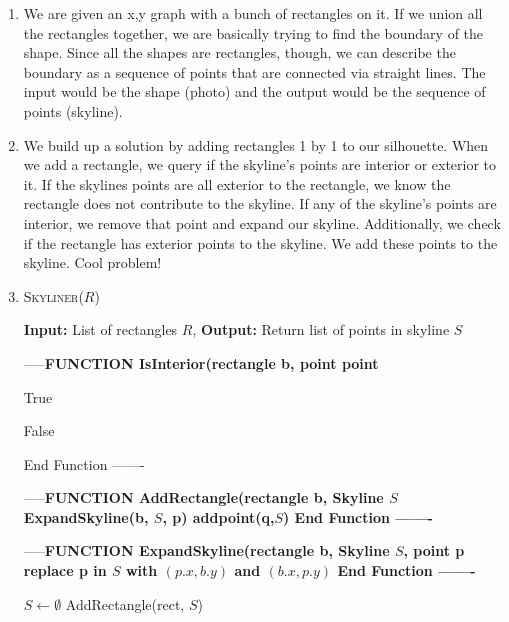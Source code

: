 \documentclass{article}
\begin{document}
\begin{enumerate}
	\item We are given an x,y graph with a bunch of rectangles on it. If we union all the rectangles together, we are basically trying to find the boundary of the shape. Since all the shapes are rectangles, though, we can describe the boundary as a sequence of points that are connected via straight lines. The input would be the shape (photo) and the output would be the sequence of points (skyline). 
	\item We build up a solution by adding rectangles 1 by 1 to our silhouette. When we add a rectangle, we query if the skyline's points are interior or exterior to it. If the skylines points are all exterior to the rectangle, we know the rectangle does not contribute to the skyline. If any of the skyline's points are interior, we remove that point and expand our skyline. Additionally, we check if the rectangle has exterior points to the skyline. We add these points to the skyline.  Cool problem!
	\item 
\begin{algorithm}\caption{\textsc{Skyliner}($R$)}\label{alg:bs}
                        {\bf Input:} List of rectangles $R$,
                        {\bf Output:} Return list of points in skyline $S$ 
                \begin{algorithmic}[h]
			\State -----\bf{FUNCTION IsInterior(rectangle b, point point}

		
			\State \Return True
			\EndIf
			
		
		\Else
			\State \Return False
		\EndIf

		\State End Function
			\State -------


	\State -----\bf{FUNCTION AddRectangle(rectangle b, Skyline $S$}
			\State ExpandSkyline(b, $S$, p)
			\EndIf
			\EndFor
			\State addpoint(q,$S$)
			\EndIf
			\EndFor
	\State End Function
	\State -------

	\State -----\bf{FUNCTION ExpandSkyline(rectangle b, Skyline $S$, point p}
			\State replace p in $S$ with $(p.x, b.y)$ and $(b.x, p.y)$
\State End Function
	\State -------




		\State $S \gets \emptyset$ 
			\State AddRectangle(rect, $S$)
			\EndFor





\end{algorithmic}
\end{algorithm}
\end{enumerate}
\end{document}
